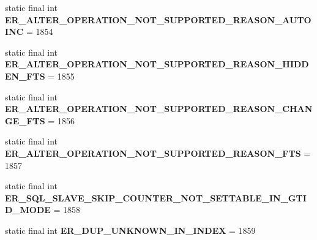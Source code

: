 \begin{DoxyCompactItemize}
\mbox{\label{classcom_1_1mysql_1_1jdbc_1_1_mysql_error_numbers_ae10b18e369aeaa8d1e59ea255753c949}} 
static final int {\bfseries E\+R\+\_\+\+A\+L\+T\+E\+R\+\_\+\+O\+P\+E\+R\+A\+T\+I\+O\+N\+\_\+\+N\+O\+T\+\_\+\+S\+U\+P\+P\+O\+R\+T\+E\+D\+\_\+\+R\+E\+A\+S\+O\+N\+\_\+\+A\+U\+T\+O\+I\+NC} = 1854
\item 
\mbox{\label{classcom_1_1mysql_1_1jdbc_1_1_mysql_error_numbers_a7662cb3388e422a14b8990bb1226510a}} 
static final int {\bfseries E\+R\+\_\+\+A\+L\+T\+E\+R\+\_\+\+O\+P\+E\+R\+A\+T\+I\+O\+N\+\_\+\+N\+O\+T\+\_\+\+S\+U\+P\+P\+O\+R\+T\+E\+D\+\_\+\+R\+E\+A\+S\+O\+N\+\_\+\+H\+I\+D\+D\+E\+N\+\_\+\+F\+TS} = 1855
\item 
\mbox{\label{classcom_1_1mysql_1_1jdbc_1_1_mysql_error_numbers_a913ff25eee2df251b9925a8936ac5361}} 
static final int {\bfseries E\+R\+\_\+\+A\+L\+T\+E\+R\+\_\+\+O\+P\+E\+R\+A\+T\+I\+O\+N\+\_\+\+N\+O\+T\+\_\+\+S\+U\+P\+P\+O\+R\+T\+E\+D\+\_\+\+R\+E\+A\+S\+O\+N\+\_\+\+C\+H\+A\+N\+G\+E\+\_\+\+F\+TS} = 1856
\item 
\mbox{\label{classcom_1_1mysql_1_1jdbc_1_1_mysql_error_numbers_a129532592d7d7c725de4debd693d426b}} 
static final int {\bfseries E\+R\+\_\+\+A\+L\+T\+E\+R\+\_\+\+O\+P\+E\+R\+A\+T\+I\+O\+N\+\_\+\+N\+O\+T\+\_\+\+S\+U\+P\+P\+O\+R\+T\+E\+D\+\_\+\+R\+E\+A\+S\+O\+N\+\_\+\+F\+TS} = 1857
\item 
\mbox{\label{classcom_1_1mysql_1_1jdbc_1_1_mysql_error_numbers_ac27c2cd98c3afe4f3a957312e6c706af}} 
static final int {\bfseries E\+R\+\_\+\+S\+Q\+L\+\_\+\+S\+L\+A\+V\+E\+\_\+\+S\+K\+I\+P\+\_\+\+C\+O\+U\+N\+T\+E\+R\+\_\+\+N\+O\+T\+\_\+\+S\+E\+T\+T\+A\+B\+L\+E\+\_\+\+I\+N\+\_\+\+G\+T\+I\+D\+\_\+\+M\+O\+DE} = 1858
\item 
\mbox{\label{classcom_1_1mysql_1_1jdbc_1_1_mysql_error_numbers_a5700f1aa140733e1a018ef066a7c1f89}} 
static final int {\bfseries E\+R\+\_\+\+D\+U\+P\+\_\+\+U\+N\+K\+N\+O\+W\+N\+\_\+\+I\+N\+\_\+\+I\+N\+D\+EX} = 1859
\item 
\mbox{\label{classcom_1_1mysql_1_1jdbc_1_1_mysql_error_numbers_af92730e3f56751a7670c80412c904d41}} 

\end{DoxyCompactItemize}
